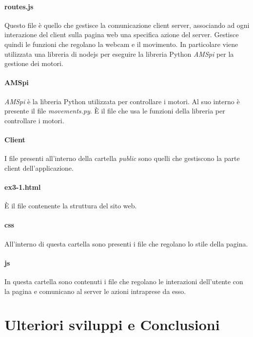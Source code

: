 \documentclass[11pt]{article}
\begin{document}
\paragraph{routes.js}
Questo file è quello che gestisce la comunicazione client server, associando ad ogni interazione del client sulla pagina web una specifica azione del server. Gestisce quindi le funzioni che regolano la webcam e il movimento. In particolare viene utilizzata una libreria di nodejs per eseguire la libreria Python \textit{AMSpi} per la gestione dei motori.
\paragraph{AMSpi}
\textit{AMSpi} è la libreria Python utilizzata per controllare i motori. Al suo interno è presente il file \textit{movements.py}. È il file che usa le funzioni della libreria per controllare i motori.
\paragraph{Client}
I file presenti all'interno della cartella \textit{public} sono quelli che gestiscono la parte client dell'applicazione.\\
\paragraph{ex3-1.html} 
È il file contenente la struttura del sito web.
\paragraph{css}
All'interno di questa cartella sono presenti i file che regolano lo stile della pagina.
\paragraph{js}
In questa cartella sono contenuti i file che regolano le interazioni dell'utente con la pagina e comunicano al server le azioni intraprese da esso.

\section{Ulteriori sviluppi e Conclusioni}	
%
%
\end{document}
